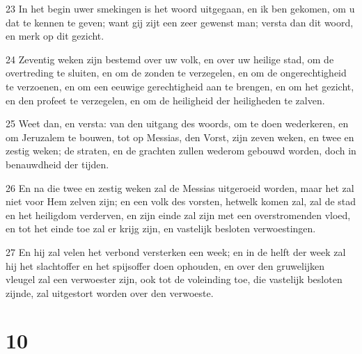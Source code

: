 \par 23 In het begin uwer smekingen is het woord uitgegaan, en ik ben gekomen, om u dat te kennen te geven; want gij zijt een zeer gewenst man; versta dan dit woord, en merk op dit gezicht.
\par 24 Zeventig weken zijn bestemd over uw volk, en over uw heilige stad, om de overtreding te sluiten, en om de zonden te verzegelen, en om de ongerechtigheid te verzoenen, en om een eeuwige gerechtigheid aan te brengen, en om het gezicht, en den profeet te verzegelen, en om de heiligheid der heiligheden te zalven.
\par 25 Weet dan, en versta: van den uitgang des woords, om te doen wederkeren, en om Jeruzalem te bouwen, tot op Messias, den Vorst, zijn zeven weken, en twee en zestig weken; de straten, en de grachten zullen wederom gebouwd worden, doch in benauwdheid der tijden.
\par 26 En na die twee en zestig weken zal de Messias uitgeroeid worden, maar het zal niet voor Hem zelven zijn; en een volk des vorsten, hetwelk komen zal, zal de stad en het heiligdom verderven, en zijn einde zal zijn met een overstromenden vloed, en tot het einde toe zal er krijg zijn, en vastelijk besloten verwoestingen.
\par 27 En hij zal velen het verbond versterken een week; en in de helft der week zal hij het slachtoffer en het spijsoffer doen ophouden, en over den gruwelijken vleugel zal een verwoester zijn, ook tot de voleinding toe, die vastelijk besloten zijnde, zal uitgestort worden over den verwoeste.

\chapter{10}

